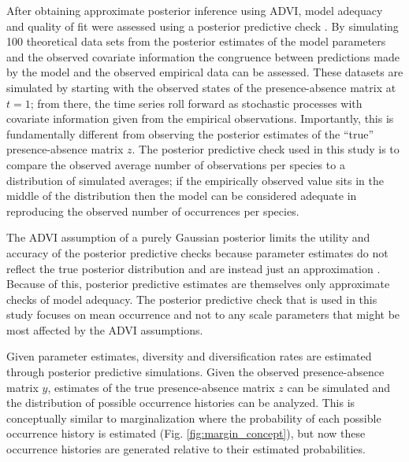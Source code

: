 \documentclass[12pt,letterpaper]{article}
\begin{document}
After obtaining approximate posterior inference using ADVI, model adequacy and quality of fit were assessed using a posterior predictive check \citep{Gelman2013d}. By simulating 100 theoretical data sets from the posterior estimates of the model parameters and the observed covariate information the congruence between predictions made by the model and the observed empirical data can be assessed. These datasets are simulated by starting with the observed states of the presence-absence matrix at \(t = 1\); from there, the time series roll forward as stochastic processes with covariate information given from the empirical observations. Importantly, this is fundamentally different from observing the posterior estimates of the ``true'' presence-absence matrix \(z\). The posterior predictive check used in this study is to compare the observed average number of observations per species to a distribution of simulated averages; if the empirically observed value sits in the middle of the distribution then the model can be considered adequate in reproducing the observed number of occurrences per species. 

The ADVI assumption of a purely Gaussian posterior limits the utility and accuracy of the posterior predictive checks because parameter estimates do not reflect the true posterior distribution and are instead just an approximation \citep{Gelman2013d}. Because of this, posterior predictive estimates are themselves only approximate checks of model adequacy. The posterior predictive check that is used in this study focuses on mean occurrence and not to any scale parameters that might be most affected by the ADVI assumptions.


Given parameter estimates, diversity and diversification rates are estimated through posterior predictive simulations. Given the observed presence-absence matrix \(y\), estimates of the true presence-absence matrix \(z\) can be simulated and the distribution of possible occurrence histories can be analyzed. This is conceptually similar to marginalization where the probability of each possible occurrence history is estimated (Fig. \ref{fig:margin_concept}), but now these occurrence histories are generated relative to their estimated probabilities.
\end{document}
